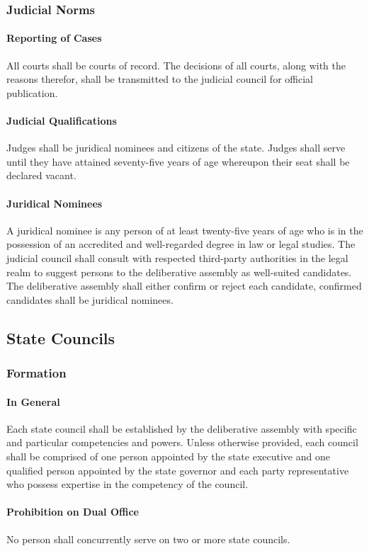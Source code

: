 \documentclass{article}
\begin{document}
\subsubsection{Judicial Norms}
\paragraph{Reporting of Cases}
All courts shall be courts of record. The decisions of all courts, along with the reasons therefor, shall be transmitted to the judicial council for official publication.
\paragraph{Judicial Qualifications}
Judges shall be juridical nominees and citizens of the state. Judges shall serve until they have attained seventy-five years of age whereupon their seat shall be declared vacant.
\paragraph{Juridical Nominees}
A juridical nominee is any person of at least twenty-five years of age who is in the possession of an accredited and well-regarded degree in law or legal studies. The judicial council shall consult with respected third-party authorities in the legal realm to suggest persons to the deliberative assembly as well-suited candidates. The deliberative assembly shall either confirm or reject each candidate, confirmed candidates shall be juridical nominees.
\subsection{State Councils}
\subsubsection{Formation}
\paragraph{In General}
Each state council shall be established by the deliberative assembly with specific and particular competencies and powers. Unless otherwise provided, each council shall be comprised of one person appointed by the state executive and one qualified person appointed by the state governor and each party representative who possess expertise in the competency of the council. 
\paragraph{Prohibition on Dual Office}
No person shall concurrently serve on two or more state councils.
\end{document}
